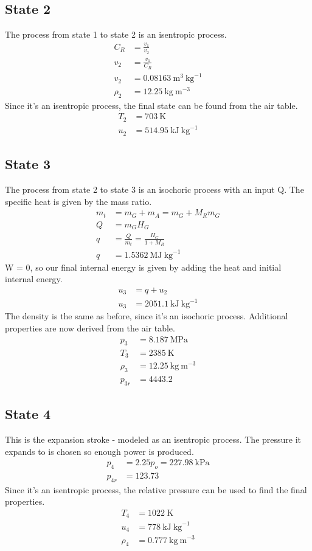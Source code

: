 \documentclass[10pt,a4paper]{article}
\begin{document}
	\subsection*{State 2}
	The process from state 1 to state 2 is an isentropic process.
	\begin{align}
		C_R &= \frac{v_1}{v_2}\\
		v_2 &= \frac{v_1}{C_R}\\
		v_2 &= 0.08163\ \text{m}^3\ \text{kg}^{-1}\\
		\rho_2 &= 12.25\ \text{kg}\ \text{m}^{-3}
	\end{align}
	Since it's an isentropic process, the final state can be found from the air table.
	\begin{align}
		T_2 &= 703\ \text{K}\\
		u_2 &= 514.95\ \text{kJ}\ \text{kg}^{-1}
	\end{align}
	\subsection*{State 3}
	The process from state 2 to state 3 is an isochoric process with an input Q. The specific heat is given by the mass ratio.
	\begin{align}
		m_t &= m_G + m_A = m_G + M_R m_G \\
		Q &= m_G H_G \\
		q &= \frac{Q}{m_t} = \frac{H_G}{1 + M_R}\\
		q &= 1.5362\ \text{MJ}\ \text{kg}^{-1}
	\end{align}
	W = 0, so our final internal energy is given by adding the heat and initial internal energy.
	\begin{align}
		u_3 &= q + u_2\\
		u_3 &= 2051.1\ \text{kJ}\ \text{kg}^{-1}
	\end{align}
	The density is the same as before, since it's an isochoric process. Additional properties are now derived from the air table.
	\begin{align}
		p_3 &= 8.187\ \text{MPa}\\
		T_3 &= 2385\ \text{K}\\
		\rho_3 &= 12.25\ \text{kg}\ \text{m}^{-3}\\
		p_{3r} &= 4443.2
	\end{align}
	\subsection*{State 4}
	This is the expansion stroke - modeled as an isentropic process. The pressure it expands to is chosen so enough power is produced.
	\begin{align}
		p_4 &= 2.25 p_o = 227.98\ \text{kPa}\\
		p_{4r} &= 123.73
	\end{align}
	Since it's an isentropic process, the relative pressure can be used to find the final properties.
	\begin{align}
		T_4 &= 1022\ \text{K}\\
		u_4 &= 778\ \text{kJ}\ \text{kg}^{-1}\\
		\rho_4 &= 0.777\ \text{kg}\ \text{m}^{-3}
	\end{align}
\end{document}
